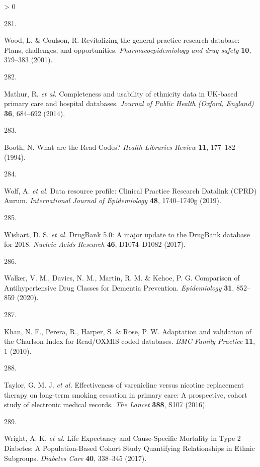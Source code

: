 \documentclass[a4paper, twoside]{templates/ociamthesis}
\newlength{\cslhangindent}
\newlength{\csllabelwidth}
\newenvironment{CSLReferences}[3] %
 {%
  \setlength{\parindent}{0pt}
  \ifodd #1 \everypar{\setlength{\hangindent}{\cslhangindent}}\ignorespaces\fi
  \ifnum #2 > 0
  \setlength{\parskip}{#2\baselineskip}
  \fi
 }%
 {}
\newcommand{\CSLLeftMargin}[1]{\parbox[t]{\maxof{\widthof{#1}}{\csllabelwidth}}{#1}}
\newcommand{\CSLRightInline}[1]{\parbox[t]{\linewidth - \csllabelwidth}{#1}}
\begin{document}
\begin{CSLReferences}{0}{0}
\leavevmode\hypertarget{ref-wood2001revitalizing}{}%
\CSLLeftMargin{281. }
\CSLRightInline{Wood, L. \& Coulson, R. Revitalizing the general practice research database: Plans, challenges, and opportunities. \emph{Pharmacoepidemiology and drug safety} \textbf{10}, 379--383 (2001).}

\leavevmode\hypertarget{ref-mathur2014}{}%
\CSLLeftMargin{282. }
\CSLRightInline{Mathur, R. \emph{et al.} Completeness and usability of ethnicity data in {UK}-based primary care and hospital databases. \emph{Journal of Public Health (Oxford, England)} \textbf{36}, 684--692 (2014).}

\leavevmode\hypertarget{ref-booth1994}{}%
\CSLLeftMargin{283. }
\CSLRightInline{Booth, N. What are the {Read Codes}? \emph{Health Libraries Review} \textbf{11}, 177--182 (1994).}

\leavevmode\hypertarget{ref-wolf2019}{}%
\CSLLeftMargin{284. }
\CSLRightInline{Wolf, A. \emph{et al.} Data resource profile: Clinical {Practice Research Datalink} ({CPRD}) {Aurum}. \emph{International Journal of Epidemiology} \textbf{48}, 1740--1740g (2019).}

\leavevmode\hypertarget{ref-wishart2017}{}%
\CSLLeftMargin{285. }
\CSLRightInline{Wishart, D. S. \emph{et al.} {DrugBank} 5.0: A major update to the {DrugBank} database for 2018. \emph{Nucleic Acids Research} \textbf{46}, D1074--D1082 (2017).}

\leavevmode\hypertarget{ref-walker2020}{}%
\CSLLeftMargin{286. }
\CSLRightInline{Walker, V. M., Davies, N. M., Martin, R. M. \& Kehoe, P. G. Comparison of {Antihypertensive Drug Classes} for {Dementia Prevention}. \emph{Epidemiology} \textbf{31}, 852--859 (2020).}

\leavevmode\hypertarget{ref-khan2010}{}%
\CSLLeftMargin{287. }
\CSLRightInline{Khan, N. F., Perera, R., Harper, S. \& Rose, P. W. Adaptation and validation of the {Charlson Index} for {Read}/{OXMIS} coded databases. \emph{BMC Family Practice} \textbf{11}, 1 (2010).}

\leavevmode\hypertarget{ref-taylor2016}{}%
\CSLLeftMargin{288. }
\CSLRightInline{Taylor, G. M. J. \emph{et al.} Effectiveness of varenicline versus nicotine replacement therapy on long-term smoking cessation in primary care: A prospective, cohort study of electronic medical records. \emph{The Lancet} \textbf{388}, S107 (2016).}

\leavevmode\hypertarget{ref-wright2017}{}%
\CSLLeftMargin{289. }
\CSLRightInline{Wright, A. K. \emph{et al.} Life {Expectancy} and {Cause}-{Specific Mortality} in {Type} 2 {Diabetes}: A {Population}-{Based Cohort Study Quantifying Relationships} in {Ethnic Subgroups}. \emph{Diabetes Care} \textbf{40}, 338--345 (2017).}


\end{CSLReferences}
\end{document}
